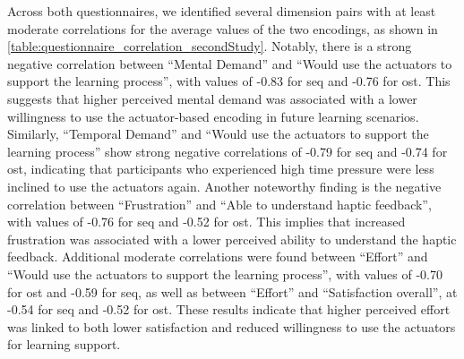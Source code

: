 Across both questionnaires, we identified several dimension pairs with at least moderate correlations for the average values of the two encodings, as shown in \autoref{table:questionnaire_correlation_secondStudy}.
Notably, there is a strong negative correlation between \enquote{Mental Demand} and \enquote{Would use the actuators to support the learning process}, with values of -0.83 for \gls{seq} and -0.76 for \gls{ost}. This suggests that higher perceived mental demand was associated with a lower willingness to use the actuator-based encoding in future learning scenarios.
Similarly, \enquote{Temporal Demand} and \enquote{Would use the actuators to support the learning process} show strong negative correlations of -0.79 for \gls{seq} and -0.74 for \gls{ost}, indicating that participants who experienced high time pressure were less inclined to use the actuators again.
Another noteworthy finding is the negative correlation between \enquote{Frustration} and \enquote{Able to understand haptic feedback}, with values of -0.76 for \gls{seq} and -0.52 for \gls{ost}. This implies that increased frustration was associated with a lower perceived ability to understand the haptic feedback.
Additional moderate correlations were found between \enquote{Effort} and \enquote{Would use the actuators to support the learning process}, with values of -0.70 for \gls{ost} and -0.59 for \gls{seq}, as well as between \enquote{Effort} and \enquote{Satisfaction overall}, at -0.54 for \gls{seq} and -0.52 for \gls{ost}. These results indicate that higher perceived effort was linked to both lower satisfaction and reduced willingness to use the actuators for learning support.


